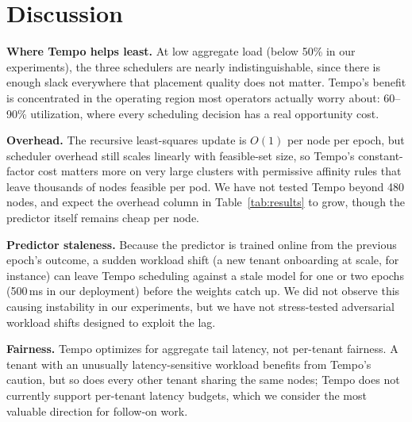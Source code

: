 \section{Discussion}
\label{sec:discussion}

\textbf{Where Tempo helps least.} At low aggregate load (below 50\% in our
experiments), the three schedulers are nearly indistinguishable, since
there is enough slack everywhere that placement quality does not matter.
Tempo's benefit is concentrated in the operating region most operators
actually worry about: 60--90\% utilization, where every scheduling decision
has a real opportunity cost.

\textbf{Overhead.} The recursive least-squares update is $O(1)$ per node
per epoch, but scheduler overhead still scales linearly with feasible-set
size, so Tempo's constant-factor cost matters more on very large clusters
with permissive affinity rules that leave thousands of nodes feasible per
pod. We have not tested Tempo beyond 480 nodes, and expect the overhead
column in Table~\ref{tab:results} to grow, though the predictor itself
remains cheap per node.

\textbf{Predictor staleness.} Because the predictor is trained online from
the previous epoch's outcome, a sudden workload shift (a new tenant onboarding
at scale, for instance) can leave Tempo scheduling against a stale model for
one or two epochs (500\,ms in our deployment) before the weights catch up.
We did not observe this causing instability in our experiments, but we have
not stress-tested adversarial workload shifts designed to exploit the lag.

\textbf{Fairness.} Tempo optimizes for aggregate tail latency, not
per-tenant fairness. A tenant with an unusually latency-sensitive workload
benefits from Tempo's caution, but so does every other tenant sharing the
same nodes; Tempo does not currently support per-tenant latency budgets,
which we consider the most valuable direction for follow-on work.
